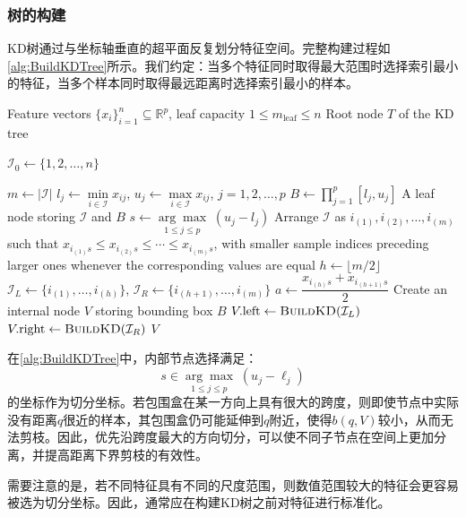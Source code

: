 \subsubsection{树的构建}
KD树通过与坐标轴垂直的超平面反复划分特征空间。完整构建过程如\cref{alg:BuildKDTree}所示。我们约定：当多个特征同时取得最大范围时选择索引最小的特征，当多个样本同时取得最远距离时选择索引最小的样本。
\begin{algorithm}[H]
	\caption{Build a KD Tree}
	\label{alg:BuildKDTree}
	\begin{algorithmic}[1]
		\Require Feature vectors $\{x_i\}_{i=1}^{n}\subseteq\mathbb{R}^{p}$, leaf capacity $1\leqslant m_{\mathrm{leaf}}\leqslant n$
		\Ensure Root node $T$ of the KD tree

		\State $\mathcal{I}_0\gets\{1,2,\dots,n\}$

		\State $m\gets|\mathcal{I}|$
		\State $l_j\gets\min\limits_{i\in\mathcal{I}}x_{ij}$, $u_j\gets\max\limits_{i\in\mathcal{I}}x_{ij}$, $j=1,2,\dots,p$
		\State $B\gets\prod\limits_{j=1}^{p}[l_j,u_j]$
		\State \Return A leaf node storing $\mathcal{I}$ and $B$
		\EndIf
		\State $s\gets\underset{1\leqslant j\leqslant p}{\arg\max}\;(u_j-l_j)$
		\State Arrange $\mathcal{I}$ as $i_{(1)},i_{(2)},\dots,i_{(m)}$ such that $x_{i_{(1)}s}\leqslant x_{i_{(2)}s}\leqslant\cdots\leqslant x_{i_{(m)}s}$, with smaller sample indices preceding larger ones whenever the corresponding values are equal
		\State $h\gets\lfloor m/2\rfloor$
		\State $\mathcal{I}_L\gets\{i_{(1)},\dots,i_{(h)}\}$, $\mathcal{I}_R\gets\{i_{(h+1)},\dots,i_{(m)}\}$
		\State $a\gets\dfrac{x_{i_{(h)}s}+x_{i_{(h+1)}s}}{2}$
		\State Create an internal node $V$ storing bounding box $B$
		\State $V.\text{left}\gets\Call{BuildKD}{\mathcal{I}_L}$
		\State $V.\text{right}\gets\Call{BuildKD}{\mathcal{I}_R}$
		\State \Return $V$
		\EndFunction

		\State \Return {}
	\end{algorithmic}
\end{algorithm}
\begin{note}
	在\cref{alg:BuildKDTree}中，内部节点选择满足：
	\begin{equation*}
		s\in
		\underset{1\leqslant j\leqslant p}{\arg\max}
		\;(u_j-\ell_j)
	\end{equation*}
	的坐标作为切分坐标。若包围盒在某一方向上具有很大的跨度，则即使节点中实际没有距离$q$很近的样本，其包围盒仍可能延伸到$q$附近，使得$b(q,V)$较小，从而无法剪枝。因此，优先沿跨度最大的方向切分，可以使不同子节点在空间上更加分离，并提高距离下界剪枝的有效性。\par
	需要注意的是，若不同特征具有不同的尺度范围，则数值范围较大的特征会更容易被选为切分坐标。因此，通常应在构建KD树之前对特征进行标准化。
\end{note}
